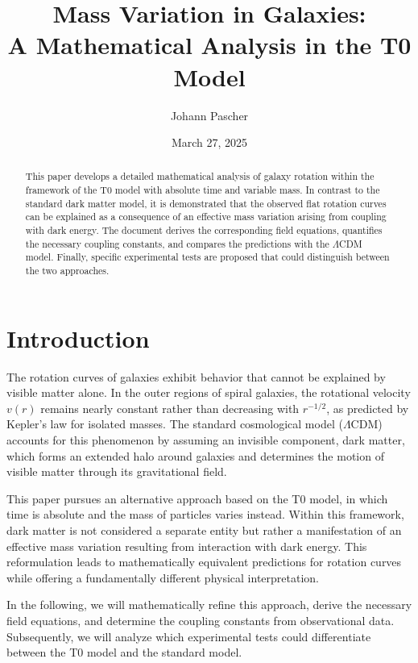 \documentclass[a4paper,12pt]{article}
\begin{document}
	
\title{Mass Variation in Galaxies: \\A Mathematical Analysis in the T0 Model}
\author{Johann Pascher}
\date{March 27, 2025}
\maketitle

\begin{abstract}
	This paper develops a detailed mathematical analysis of galaxy rotation within the framework of the T0 model with absolute time and variable mass. In contrast to the standard dark matter model, it is demonstrated that the observed flat rotation curves can be explained as a consequence of an effective mass variation arising from coupling with dark energy. The document derives the corresponding field equations, quantifies the necessary coupling constants, and compares the predictions with the $\Lambda$CDM model. Finally, specific experimental tests are proposed that could distinguish between the two approaches.
\end{abstract}

\tableofcontents
\newpage

\section{Introduction}

The rotation curves of galaxies exhibit behavior that cannot be explained by visible matter alone. In the outer regions of spiral galaxies, the rotational velocity $v(r)$ remains nearly constant rather than decreasing with $r^{-1/2}$, as predicted by Kepler’s law for isolated masses. The standard cosmological model ($\Lambda$CDM) accounts for this phenomenon by assuming an invisible component, dark matter, which forms an extended halo around galaxies and determines the motion of visible matter through its gravitational field.

This paper pursues an alternative approach based on the T0 model, in which time is absolute and the mass of particles varies instead. Within this framework, dark matter is not considered a separate entity but rather a manifestation of an effective mass variation resulting from interaction with dark energy. This reformulation leads to mathematically equivalent predictions for rotation curves while offering a fundamentally different physical interpretation.

In the following, we will mathematically refine this approach, derive the necessary field equations, and determine the coupling constants from observational data. Subsequently, we will analyze which experimental tests could differentiate between the T0 model and the standard model.
\end{document}
